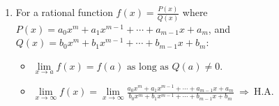 \documentclass[12pt, a4paper]{article}
\newtheorem{definition}{Definition}[subsection]
\newtheorem{example}{Example}[subsection]
\begin{document}
\begin{enumerate}
\begin{itemize}
\begin{example}
\begin{figure}[H]
            \end{figure}
            \begin{itemize}
                \item $\lim\limits_{x\rightarrow 0}\frac{1}{x}$ doest not exist. 
                $$\because \lim_{x\rightarrow 0^+}\frac{1}{x}=+\infty,\ \lim_{x\rightarrow 0^-}\frac{1}{x}=-\infty$$
                $$\therefore \lim_{x\rightarrow 0^+}\frac{1}{x}\neq\lim_{x\rightarrow 0^-}\frac{1}{x} \Rightarrow \text{DNE.} $$
                \item $\lim\limits_{x\rightarrow \infty}\frac{1}{x}$ exists. 
                $$\because \lim_{x\rightarrow +\infty}\frac{1}{x}=0,\ \lim_{x\rightarrow -\infty}\frac{1}{x}=0$$
                $$\therefore \lim_{x\rightarrow +\infty}\frac{1}{x}=\lim_{x\rightarrow -\infty}\frac{1}{x} \Rightarrow \text{Limit exists.}$$
            \end{itemize}
        \end{example}
        \begin{definition}
            {\color{red}\textbf{Horizontal Asymptote (H.A.)}}: 
            $$y=\lim_{x\rightarrow \infty}f(x)=c$$
        \end{definition}
        \item Limit at $\infty$: 
        $${\color{red}\lim_{x\rightarrow +\infty}f(x)=\lim_{x\rightarrow -\infty}f(x)=c\ \Rightarrow \ \lim_{x\rightarrow \infty}f(x)=c}.$$
        {\color{green}{Note: $+\infty$ and $-\infty$ are not exact values; they should be regarded as a concept.}}
        \item Limites does not have to equal to the function value. \\
        Limit and the function value do not have relationships.
        \item Generally speaking, if $a \in D_f,\ \lim\limits_{x\rightarrow a}f(x)=f(a)$.
    \end{itemize}
    \item For a rational function $f(x)=\frac{P(x)}{Q(x)}$ where $P(x)=a_0x^m+a_1x^{m-1}+\cdots+a_{m-1}x+a_m$, and $Q(x)=b_0x^m+b_1x^{m-1}+\cdots+b_{m-1}x+b_m$:
    \begin{itemize}
        \item $\lim\limits_{x\rightarrow a}f(x)=f(a)\text{ as long as }Q(a)\neq 0.$
        \item $\lim\limits_{x\rightarrow \infty}f(x)=\lim\limits_{x\rightarrow \infty}\frac{a_0x^m+a_1x^{m-1}+\cdots+a_{m-1}x+a_m}{b_0x^m+b_1x^{m-1}+\cdots+b_{m-1}x+b_m}\ \Rightarrow\ \text{H.A.}$

\end{itemize}
\end{enumerate}
\end{document}

